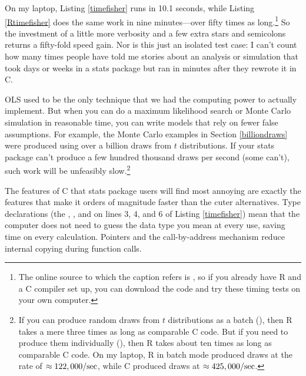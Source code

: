 On my laptop, Listing \ref{timefisher} runs in
10.1 seconds, while Listing \ref{Rtimefisher} does the same work in nine
minutes---over fifty times as long.\footnote{The online source to which
the caption refers is \samplecodelocation, so if you already have R and
a C compiler set up, you can download the code and try these timing
tests on your own computer.} So the investment of a little more
verbosity and a few extra stars and semicolons returns a fifty-fold
speed gain. Nor is this just an isolated test case: I can't count how
many times people have told me stories about an analysis or simulation
that took days or weeks in a stats package but ran in minutes after they
rewrote it in C.

OLS used to be the only technique that we had the computing power to
actually implement. But when you can do a maximum likelihood search
or Monte Carlo simulation in reasonable time, you can write models
that rely on fewer false assumptions. For example, the Monte Carlo examples in Section
\ref{billiondraws} were produced using over a billion draws from $t$
distributions. If your stats package can't produce a few hundred thousand 
draws per second (some can't), such work will be unfeasibly
slow.\footnote{If you can produce random draws from $t$ distributions
as a batch (), then R takes a mere three
times as long as comparable C code. But if you need to produce them
individually (), then R 
takes about ten times as long as comparable C code. On my laptop, R in
batch mode produced draws at the rate of $\approx 122,000/{\rm sec}$,
while C produced draws at $\approx 425,000/{\rm sec}$.}

The features of C that stats package users will find most annoying are
exactly the features that make it orders of magnitude faster than the cuter
alternatives.  Type declarations (the , , and
 on lines 3, 4, and 6 of Listing \ref{timefisher}) mean
that the computer does not need to guess the data type you mean at every
use, saving time on every calculation.  Pointers and the call-by-address
mechanism reduce internal copying during function calls.

